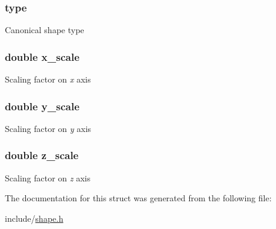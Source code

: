 \subsubsection[{\texorpdfstring{type}{type}}]{ type}\hypertarget{struct_shape_aa987badbde9a01a186366bf0bb305a4b}{}\label{struct_shape_aa987badbde9a01a186366bf0bb305a4b}
Canonical shape type 
\subsubsection[{\texorpdfstring{x\+\_\+scale}{x_scale}}]{\setlength{\rightskip}{0pt plus 5cm}double x\+\_\+scale}\hypertarget{struct_shape_a9672a1c41e5dd46a6e5f78070594d865}{}\label{struct_shape_a9672a1c41e5dd46a6e5f78070594d865}
Scaling factor on {\itshape x} axis 
\subsubsection[{\texorpdfstring{y\+\_\+scale}{y_scale}}]{\setlength{\rightskip}{0pt plus 5cm}double y\+\_\+scale}\hypertarget{struct_shape_aa03f352193dc2f09d41e8ac49230ca83}{}\label{struct_shape_aa03f352193dc2f09d41e8ac49230ca83}
Scaling factor on {\itshape y} axis 
\subsubsection[{\texorpdfstring{z\+\_\+scale}{z_scale}}]{\setlength{\rightskip}{0pt plus 5cm}double z\+\_\+scale}\hypertarget{struct_shape_abf9d44d8547f49eefd5a5ebf596cb803}{}\label{struct_shape_abf9d44d8547f49eefd5a5ebf596cb803}
Scaling factor on {\itshape z} axis 

The documentation for this struct was generated from the following file\+:\begin{DoxyCompactItemize}
\item 
include/\hyperlink{shape_8h}{shape.\+h}\end{DoxyCompactItemize}

